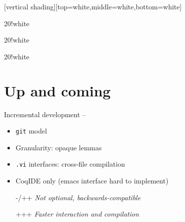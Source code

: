 [vertical shading][top=white,middle=white,bottom=white]

\def\bulletfail{\alert{\ding{54}}}
\def\bulletcheck{\ding{52}}



{\begin{colormixin}{20!white}{}\end{colormixin}\unskip}

{\begin{colormixin}{20!white}{}\end{colormixin}\unskip}

{\begin{colormixin}{20!white}{}\end{colormixin}\unskip}


\section{Up and coming}


\begin{subsecframe}{Incremental development -- }
  \begin{itemize}
  \item \texttt{git} model
  \item Granularity: opaque lemmas
  \item \texttt{.vi} interfaces: cross-file compilation
  \item CoqIDE only (emacs interface hard to implement)
  \end{itemize}

  \begin{itemize}
  \item[-/++] \emph{Not optional, backwards-compatible}
  \item[+++] \emph{Faster interaction and compilation}
  \end{itemize}
\end{subsecframe}

